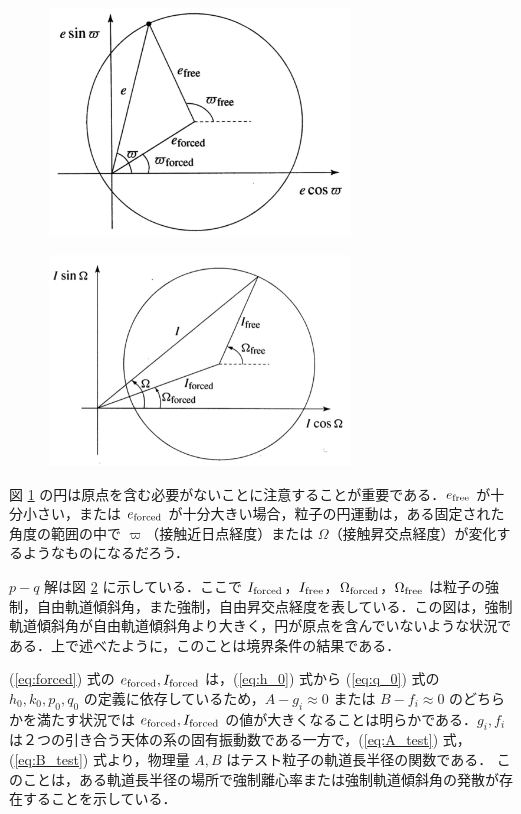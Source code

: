 \documentclass[11pt,a4paper,oneside,onecolumn]{jarticle}
\begin{document}
\begin{figure}[H]
\centering
\includegraphics[width=8cm]{./image/sec7_2.pdf}
\caption{\label{fig:geometrical_e}}
\end{figure}

\begin{figure}[H]
\centering
\includegraphics[width=8cm]{./image/sec7_3.pdf}
\caption{\label{fig:geometrical_I}}
\end{figure}

図 \ref{fig:geometrical_e} の円は原点を含む必要がないことに注意することが重要である．$e_{\rm free}$ が十分小さい，または $e_{\rm forced}$ が十分大きい場合，粒子の円運動は，ある固定された角度の範囲の中で $\varpi$（接触近日点経度）または $\Omega$（接触昇交点経度）が変化するようなものになるだろう．

$p - q$ 解は図 \ref{fig:geometrical_I} に示している．ここで $I_{\rm forced}$，$I_{\rm free}$，$\Omega_{\rm forced}$，$\Omega_{\rm free}$ は粒子の強制，自由軌道傾斜角，また強制，自由昇交点経度を表している．この図は，強制軌道傾斜角が自由軌道傾斜角より大きく，円が原点を含んでいないような状況である．上で述べたように，このことは境界条件の結果である．

(\ref{eq:forced}) 式の $e_{\rm forced}, I_{\rm forced}$ は，(\ref{eq:h_0}) 式から (\ref{eq:q_0}) 式の $h_0, k_0, p_0, q_0$ の定義に依存しているため，$A - g_i \approx 0$ または $B - f_i \approx 0$ のどちらかを満たす状況では $e_{\rm forced}, I_{\rm forced}$ の値が大きくなることは明らかである．$g_i, f_i$ は２つの引き合う天体の系の固有振動数である一方で，(\ref{eq:A_test}) 式，(\ref{eq:B_test}) 式より，物理量 $A, B$ はテスト粒子の軌道長半径の関数である． このことは，ある軌道長半径の場所で強制離心率または強制軌道傾斜角の発散が存在することを示している．
\end{document}
